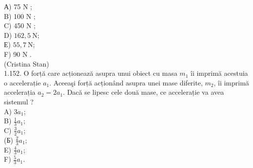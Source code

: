 \documentclass[10pt]{article}
\begin{document}
А) 75 N ;\\
B) 100 N ;\\
C) 450 N ;\\
D) $162,5 \mathrm{~N}$;\\
Е) $55,7 \mathrm{~N}$;\\
F) 90 N .\\
(Cristina Stan)\\
1.152. O forță care acționează asupra unui obiect cu masa $m_{1}$ îi imprimă acestuia o accelerație $a_{1}$. Aceeaşi forță acționând asupra unei mase diferite, $m_{2}$, îi imprimă accelerația $a_{2}=2 a_{1}$. Dacă se lipesc cele două mase, ce accelerație va avea sistemul ?\\
A) $3 a_{1}$;\\
B) $\frac{1}{3} a_{1}$;\\
C) $\frac{3}{2} a_{1}$;\\
(Б) $\frac{2}{3} a_{1}$;\\
E) $\frac{4}{3} a_{1}$;\\
F) $\frac{5}{3} a_{1}$.
\end{document}
